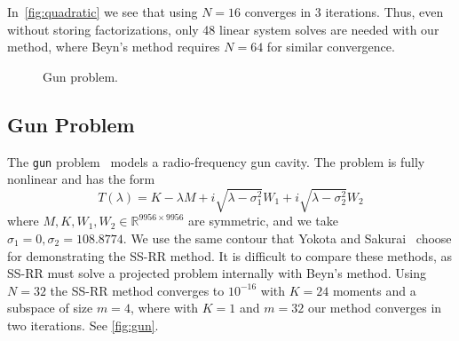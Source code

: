 \documentclass[onefignum,onetabnum]{siamart190516}
\begin{document}
In~\autoref{fig:quadratic} we see that using \( N=16 \) converges in 3 iterations.
Thus, even without storing factorizations, only 48 linear system solves are needed with our method, where Beyn's method requires \( N=64 \) for similar convergence.


\begin{figure}[htbp]
	\centering
  \caption{Gun problem.}
  \label{fig:gun}
\end{figure}

\subsection{Gun Problem}
The \verb$gun$ problem~\cite{betcke2013} models a radio-frequency gun cavity.
The problem is fully nonlinear and has the form
\begin{equation}
    T(\lambda) = K - \lambda M + i \sqrt{\lambda - \sigma_1^2} W_1 + i \sqrt{\lambda - \sigma_2^2} W_2
\end{equation}
where \(M,K,W_1, W_2 \in \mathbb{R}^{9956\times9956}\) are symmetric, and we take \(\sigma_1 = 0, \sigma_2 = 108.8774\).
We use the same contour that Yokota and Sakurai~\cite{yokota2013} choose for demonstrating the SS-RR method.
It is difficult to compare these methods, as SS-RR must solve a projected problem internally with Beyn's method.
Using \(N=32\) the SS-RR method converges to \(10^{-16}\) with \(K=24\) moments and a subspace of size \(m=4\), where with \(K=1\) and \(m=32\) our method converges in two iterations.
See \autoref{fig:gun}.
\end{document}
